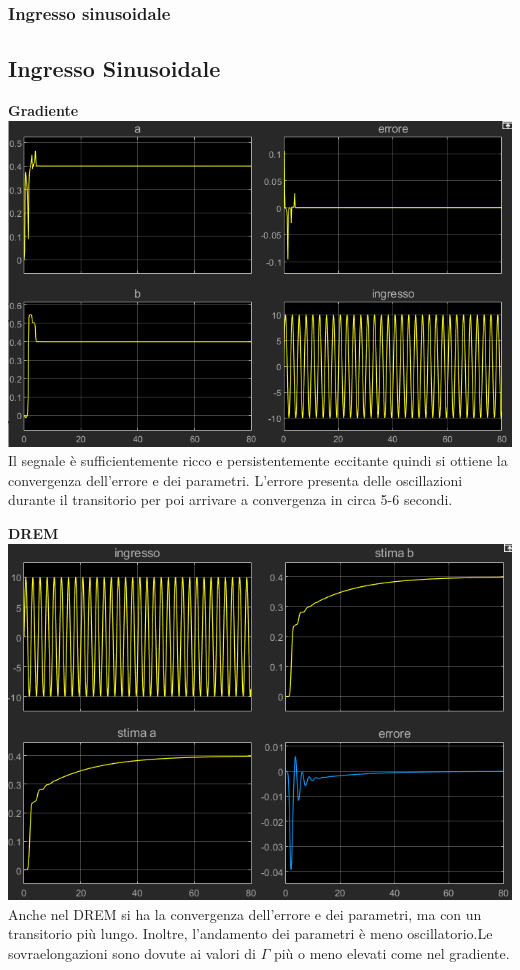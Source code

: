\documentclass{beamer}
\begin{document}
\begin{frame}
	\frametitle{Ingresso sinusoidale}
	\subsection{Ingresso Sinusoidale}
	\vspace{-0.1cm}
	\begin{minipage}[t]{0.42\textwidth}
		\textbf{Gradiente}
		\includegraphics[scale=0.28]{2022-05-09-18-10-53.png}\\%
		\footnotesize
				Il segnale è sufficientemente ricco e persistentemente eccitante quindi si ottiene la convergenza dell'errore e dei parametri. L'errore presenta delle oscillazioni durante il transitorio per poi arrivare a convergenza in circa 5-6 secondi.
	\end{minipage}\hspace{1cm}
	\begin{minipage}[t]{0.42\textwidth}
		\textbf{DREM}
		\includegraphics[scale=0.28]{2022-05-09-18-14-02.png}\\%
		\footnotesize
		Anche nel DREM si ha la convergenza dell'errore e dei parametri, ma con un transitorio più lungo. Inoltre, l'andamento dei parametri è meno oscillatorio.Le sovraelongazioni sono dovute ai valori di \(\Gamma\) più o meno elevati come nel gradiente.
	\end{minipage}
\end{frame}
\end{document}
